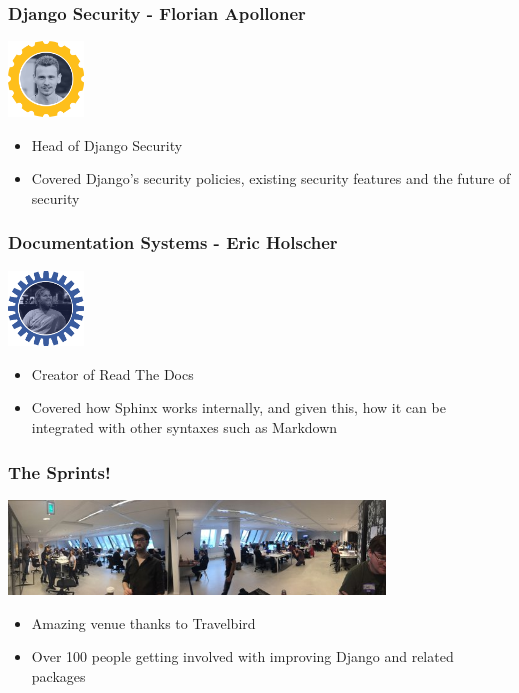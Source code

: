 \documentclass{beamer}
\begin{document}
\begin{frame}[fragile]\frametitle{Django Security - Florian Apolloner}

    \begin{center}
        \includegraphics[width=2cm]{speaker-florian}
    \end{center}

    \begin{itemize}
        \item Head of Django Security
        \item Covered Django's security policies, existing security features and the future of security
    \end{itemize}

\end{frame}


\begin{frame}[fragile]\frametitle{Documentation Systems - Eric Holscher}

    \begin{center}
        \includegraphics[width=2cm]{speaker-eric}
    \end{center}

    \begin{itemize}
        \item Creator of Read The Docs
        \item Covered how Sphinx works internally, and given this, how it can be integrated with other syntaxes such as Markdown
    \end{itemize}

\end{frame}


\begin{frame}[fragile]\frametitle{The Sprints!}

    \begin{center}
        \includegraphics[width=10cm]{duth-sprints-panorama}
    \end{center}

    \begin{itemize}
        \item Amazing venue thanks to Travelbird
        \item Over 100 people getting involved with improving Django and related packages
    \end{itemize}

\end{frame}
\end{document}
